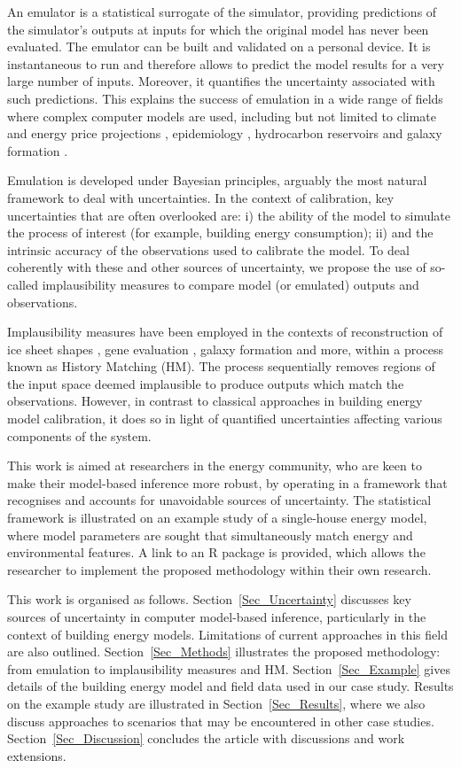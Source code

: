 \documentclass[preprint,12pt, sort&compress]{elsarticle}
\begin{document}
An emulator is a statistical surrogate of the simulator, providing predictions of the simulator’s outputs at inputs for which the original model has never been evaluated. The emulator can be built and validated on a personal device. It is instantaneous to run and therefore allows to predict the model results for a very large number of inputs. Moreover, it quantifies the uncertainty associated with such predictions. This explains the success of emulation in a wide range of fields where complex computer models are used, including but not limited to climate \cite{edwards2021} and energy price projections \cite{wilson2018}, epidemiology \cite{andrianakis2015}, hydrocarbon reservoirs \cite{craig1997} and galaxy formation \cite{vernon2010galaxy}.

Emulation is developed under Bayesian principles, arguably the most natural framework to deal with uncertainties. In the context of calibration, key uncertainties that are often overlooked are: i) the ability of the model to simulate the process of interest (for example, building energy consumption); ii) and the intrinsic accuracy of the observations used to calibrate the model. To deal coherently with these and other sources of uncertainty, we propose the use of so-called implausibility measures to compare model (or emulated) outputs and observations.

Implausibility measures have been employed in the contexts of reconstruction of ice sheet shapes \cite{domingo2020}, gene evaluation \cite{vernon2018gene}, galaxy formation \cite{vernon2010galaxy} and more, within a process known as History Matching (HM). The process sequentially removes regions of the input space deemed implausible to produce outputs which match the observations. However, in contrast to classical approaches in building energy model calibration, it does so in light of quantified uncertainties affecting various components of the system. 

This work is aimed at researchers in the energy community, who are keen to make their model-based inference more robust, by operating in a framework that recognises and accounts for unavoidable sources of uncertainty. The statistical framework is illustrated on an example study of a single-house energy model, where model parameters are sought that simultaneously match energy and environmental features. A link to an R package is provided, which allows the researcher to implement the proposed methodology within their own research.

This work is organised as follows. Section~\ref{Sec_Uncertainty} discusses key sources of uncertainty in computer model-based inference, particularly in the context of building energy models. Limitations of current approaches in this field are also outlined. Section~\ref{Sec_Methods} illustrates the proposed methodology: from emulation to implausibility measures and HM. Section~\ref{Sec_Example} gives details of the building energy model and field data used in our case study. Results on the example study are illustrated in Section~\ref{Sec_Results}, where we also discuss approaches to scenarios that may be encountered in other case studies. Section~\ref{Sec_Discussion} concludes the article with discussions and work extensions.
\end{document}
